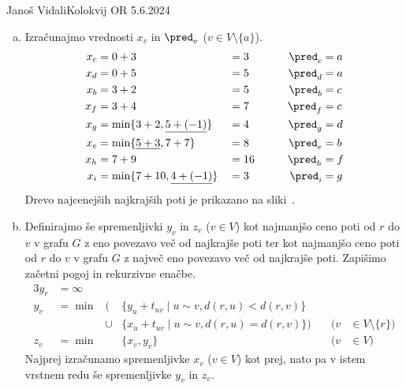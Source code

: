 \begin{naloga}{Janoš Vidali}{Kolokvij OR 5.6.2024}
\begin{odgovor}
\begin{enumerate}[(a)]
\item Izračunajmo vrednosti $x_v$ in $\pred_v$ ($v \in V \setminus \{a\}$).
\begin{alignat*}{4}
x_c &= 0 + 3 &&= 3 &\qquad \pred_c &= a \\
x_d &= 0 + 5 &&= 5 &\qquad \pred_d &= a \\
x_b &= 3 + 2 &&= 5 &\qquad \pred_b &= c \\
x_f &= 3 + 4 &&= 7 &\qquad \pred_f &= c \\
x_g &= \min\{3+2, \underline{5 + (-1)}\} &&= 4 &\qquad \pred_g &= d \\
x_e &= \min\{\underline{5+3}, 7+7\} &&= 8 &\qquad \pred_e &= b \\
x_h &= 7 + 9 &&= 16 &\qquad \pred_h &= f \\
x_i &= \min\{7+10, \underline{4 + (-1)}\} &&= 3 &\qquad \pred_i &= g
\end{alignat*}
Drevo najcenejših najkrajših poti je prikazano na sliki~.
%
\begin{slika}
\end{slika}

\item Definirajmo še spremenljivki $y_v$ in $z_v$ ($v \in V$)
kot najmanjšo ceno poti od $r$ do $v$ v grafu $G$
z eno povezavo več od najkrajše poti
ter kot najmanjšo ceno poti od $r$ do $v$ v grafu $G$
z največ eno povezavo več od najkrajše poti.
Zapišimo začetni pogoj in rekurzivne enačbe.
\begin{alignat*}{3}
y_r &= \infty \\
y_v &= \min&\big(&\{y_u + t_{uv} \mid u \sim v, d(r, u) < d(r, v)\} \\
&&\cup &\{x_u + t_{uv} \mid u \sim v, d(r, u) = d(r, v)\}\big) &\quad (v &\in V \setminus \{r\}) \\
z_v &= \min&&\{x_v, y_v\} &\quad (v &\in V)
\end{alignat*}
Najprej izračunamo spremenljivke $x_v$ ($v \in V$) kot prej,
nato pa v istem vrst\-nem redu še spremenljivke $y_v$ in $z_v$.

\end{enumerate}
\end{odgovor}
\end{naloga}
